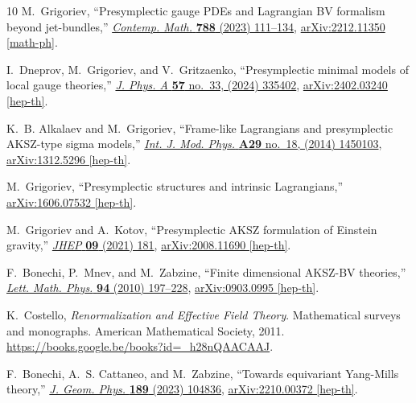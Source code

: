 \documentclass[a4paper,12pt]{article}
\numberwithin{equation}{section} %
\begin{document}
\begin{thebibliography}{10}
M.~Grigoriev, ``{Presymplectic gauge PDEs and Lagrangian BV formalism beyond jet-bundles},'' \href{http://dx.doi.org/10.1090/conm/788/15822}{{\em Contemp. Math.} {\bfseries 788} (2023) 111--134}, \href{http://arxiv.org/abs/2212.11350}{{\ttfamily arXiv:2212.11350 [math-ph]}}.

I.~Dneprov, M.~Grigoriev, and V.~Gritzaenko, ``{Presymplectic minimal models of local gauge theories},'' \href{http://dx.doi.org/10.1088/1751-8121/ad65a3}{{\em J. Phys. A} {\bfseries 57} no.~33, (2024) 335402}, \href{http://arxiv.org/abs/2402.03240}{{\ttfamily arXiv:2402.03240 [hep-th]}}.

K.~B. Alkalaev and M.~Grigoriev, ``{Frame-like Lagrangians and presymplectic AKSZ-type sigma models},'' \href{http://dx.doi.org/10.1142/S0217751X14501036}{{\em Int. J. Mod. Phys.} {\bfseries A29} no.~18, (2014) 1450103},
\href{http://arxiv.org/abs/1312.5296}{{\ttfamily arXiv:1312.5296 [hep-th]}}.

M.~Grigoriev, ``{Presymplectic structures and intrinsic Lagrangians},''
\href{http://arxiv.org/abs/1606.07532}{{\ttfamily arXiv:1606.07532 [hep-th]}}.

M.~Grigoriev and A.~Kotov, ``{Presymplectic AKSZ formulation of Einstein gravity},'' \href{http://dx.doi.org/10.1007/JHEP09(2021)181}{{\em JHEP} {\bfseries 09} (2021) 181}, \href{http://arxiv.org/abs/2008.11690}{{\ttfamily arXiv:2008.11690 [hep-th]}}.

F.~Bonechi, P.~Mnev, and M.~Zabzine, ``{F}inite dimensional {AKSZ}-{BV} theories,'' \href{http://dx.doi.org/10.1007/s11005-010-0423-3}{{\em Lett. Math. Phys.} {\bfseries 94} (2010) 197--228},
\href{http://arxiv.org/abs/0903.0995}{{\ttfamily arXiv:0903.0995 [hep-th]}}.

K.~Costello, {\em Renormalization and Effective Field Theory}.
\newblock Mathematical surveys and monographs. American Mathematical Society, 2011.
\newblock \url{https://books.google.be/books?id=_h28nQAACAAJ}.

F.~Bonechi, A.~S. Cattaneo, and M.~Zabzine, ``{Towards equivariant Yang-Mills theory},'' \href{http://dx.doi.org/10.1016/j.geomphys.2023.104836}{{\em J. Geom. Phys.} {\bfseries 189} (2023) 104836}, \href{http://arxiv.org/abs/2210.00372}{{\ttfamily arXiv:2210.00372 [hep-th]}}.


\end{thebibliography}
\end{document}
